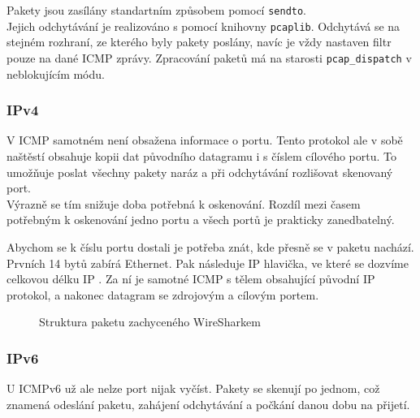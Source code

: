 \documentclass[11pt, a4paper]{article}
\begin{document}
Pakety jsou zasílány standartním způsobem pomocí \texttt{sendto}. \\

Jejich odchytávání je realizováno s pomocí knihovny \texttt{pcaplib}. Odchytává se na stejném rozhraní, ze kterého byly pakety poslány, navíc je vždy nastaven filtr pouze na dané ICMP zprávy. Zpracování paketů má na starosti \texttt{pcap\_dispatch} v neblokujícím módu.\\

\subsubsection*{IPv4}
V ICMP samotném není obsažena informace o portu. Tento protokol ale v sobě naštěstí obsahuje kopii dat původního datagramu i s číslem cílového portu. To umožňuje poslat všechny pakety naráz a při odchytávání rozlišovat skenovaný port.\\

Výrazně se tím snižuje doba potřebná k oskenování. Rozdíl mezi časem potřebným k oskenování jedno portu a všech portů je prakticky zanedbatelný.

Abychom se k číslu portu dostali je potřeba znát, kde přesně se v paketu nachází.
Prvních 14 bytů zabírá Ethernet. Pak následuje IP hlavička, ve které se dozvíme celkovou délku IP\cite{packCont} . Za ní je samotné ICMP s tělem obsahující původní IP protokol, a nakonec datagram se zdrojovým a cílovým portem.

\bigskip

\begin{figure}[ht]
	\begin{center}
	\caption{Struktura paketu zachyceného WireSharkem}
	\end{center}
\end{figure}

\bigskip

\subsubsection*{IPv6}
U ICMPv6 už ale nelze port nijak vyčíst. Pakety se skenují po jednom, což znamená odeslání paketu, zahájení odchytávání a počkání danou dobu na přijetí. \\
\end{document}
